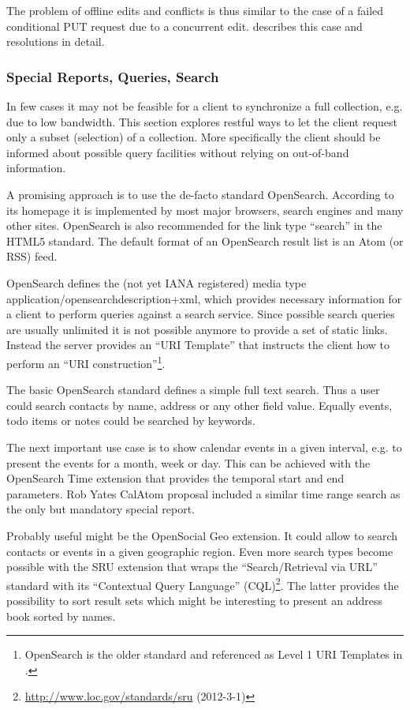 \documentclass[12pt,a4paper,twoside]{scrartcl}		%
\newcommand{\citeurl}[2]{\url{#1} (#2)}
\begin{document}
The problem of offline edits and conflicts is thus similar to the case of a
failed conditional PUT request due to a concurrent edit. \cite{Nielsen1999}
describes this case and resolutions in detail.


\subsubsection{Special Reports, Queries, Search}
\label{sec:spec-reports-search}

In few cases it may not be feasible for a client to synchronize a full
collection, e.g. due to low bandwidth. This section explores restful ways to let
the client request only a subset (selection) of a collection. More specifically
the client should be informed about possible query facilities without relying on
out-of-band information.

A promising approach is to use the de-facto standard
OpenSearch\cite{Clinton}. According to its homepage it is implemented by most
major browsers, search engines and many other sites. OpenSearch is also
recommended for the link type ``search'' in the HTML5
standard\cite[sec. 4.12.4.12]{Hickson2011a}. The default format of an OpenSearch
result list is an Atom (or RSS) feed.

OpenSearch defines the (not yet IANA registered) media type
application/opensearchdescription+xml, which provides necessary information for
a client to perform queries against a search service. Since possible search
queries are usually unlimited it is not possible anymore to provide a set of
static links. Instead the server provides an ``URI Template''\cite{Gregorio2012}
that instructs the client how to perform an ``URI
construction''\footnote{OpenSearch is the older standard and referenced as Level
  1 URI Templates in \cite{Gregorio2012}.}.

The basic OpenSearch standard defines a simple full text search. Thus a user
could search contacts by name, address or any other field value. Equally events,
todo items or notes could be searched by keywords.

The next important use case is to show calendar events in a given interval,
e.g. to present the events for a month, week or day. This can be achieved with
the OpenSearch Time extension that provides the temporal start and end
parameters. Rob Yates CalAtom\cite{draft-yates-atompub-calatom-00.txt} proposal
included a similar time range search as the only but mandatory special report.

Probably useful might be the OpenSocial Geo extension. It could allow to search
contacts or events in a given geographic region. Even more search types become
possible with the SRU extension that wraps the ``Search/Retrieval via URL''
standard with its ``Contextual Query Language''
(CQL)\footnote{\citeurl{http://www.loc.gov/standards/sru}{2012-3-1}}. The latter
provides the possibility to sort result sets which might be interesting to
present an address book sorted by names.
\end{document}
